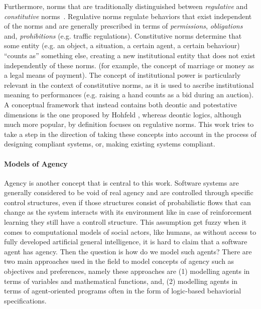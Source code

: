 Furthermore, norms that are traditionally distinguished between \textit{regulative} and \textit{constitutive} norms~\cite{Searle1969,Boella2004RegulativeSystems,Sileno2015}. Regulative norms regulate behaviors that exist independent of the norms and are generally prescribed in terms of \textit{permissions}, \textit{obligations} and, \textit{prohibitions} (e.g. traffic regulations). Constitutive norms determine that some entity (e.g. an object, a situation, a certain agent, a certain behaviour) ``counts as'' something else, creating a new institutional entity that does not exist independently of these norms. (for example, the concept of marriage or money as a legal means of payment). The concept of institutional power is particularly relevant in the context of constitutive norms, as it is used to ascribe institutional meaning to  performances (e.g. raising a hand counts as a bid during an auction). A conceptual framework that instead contains both deontic and potestative dimensions is the one proposed by Hohfeld \cite{hohfeld1917fundamental}, whereas deontic logics, although much more popular, by definition focuses on regulative norms. This work tries to take a step in the direction of taking these concepts into account in the process of designing compliant systems, or, making existing systems compliant.

\paragraph{Models of Agency}
Agency is another concept that is central to this work. Software systems are generally considered to be void of real agency and are controlled through specific control structures, even if those structures consist of probabilistic flows that can change as the system interacts with its environment like in case of reinforcement learning they still have a controll structure. This assumption get fuzzy when it comes to computational models of social actors, like humans, as without access to fully developed artificial general intelligence, it is hard to claim that a software agent has agency. Then the question is how do we model such agents? There are two main approaches used in the field to model concepts of agency such as objectives and preferences, namely these approaches are (1) modelling agents in terms of variables and mathematical functions, and, (2) modelling agents in terms of agent-oriented programs often in the form of logic-based behaviorial specifications. 


